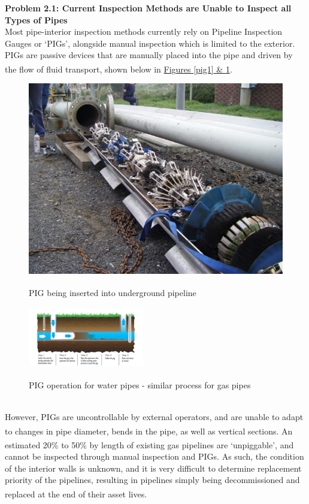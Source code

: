 \documentclass[11pt]{article}		%
\newcommand{\supercite}[1]{\textsuperscript{\cite{#1}}}		%
\begin{document}
	\textbf{Problem 2.1: Current Inspection Methods are Unable to Inspect all Types of Pipes }
	\\
	Most pipe-interior inspection methods currently rely on Pipeline Inspection Gauges or ‘PIGs’, alongside manual inspection which is limited to the exterior. PIGs are passive devices that are manually placed into the pipe and driven by the flow of fluid transport\supercite{pigging}, shown below in \hyperref[pig1]{Figures \ref*{pig1} \& \ref*{pig2}}.
		\begin{figure}[h]
					\centering
					\begin{multicols}{2}
						\includegraphics[height=0.22\textwidth]{pig1.jpg}
						\caption{PIG being inserted into underground pipeline\supercite{pigimage1}}
						\label{pig1}
						\columnbreak
						\includegraphics[width=0.45\textwidth]{pig2.jpg}
						\caption{PIG operation for water pipes - similar process for gas pipes\supercite{pigimage2}}
						\label{pig2}
					\end{multicols}
				\end{figure}
			\vspace{-0.75cm}
    \\
    \hspace*{2ex}However, PIGs are uncontrollable by external operators, and are unable to adapt to changes in pipe diameter, bends in the pipe, as well as vertical sections\supercite{piglimitations}. An estimated 20\% to 50\% by length of existing gas pipelines are ‘unpiggable’\supercite{unpiggable}, and cannot be inspected through manual inspection and PIGs. As such, the condition of the interior walls is unknown, and it is very difficult to determine replacement priority of the pipelines, resulting in pipelines simply being decommissioned and replaced at the end of their asset lives\supercite{decommission}.
    
\end{document}
